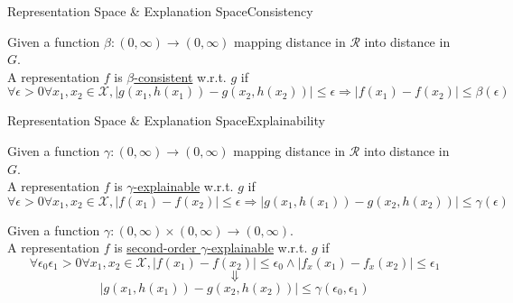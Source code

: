 \documentclass[10pt, aspectratio=169]{beamer}
\begin{document}
	\begin{frame}[t]{Representation Space \& Explanation Space}{Consistency}
		\begin{definition}
			Given a function $\beta: (0, \infty)\to (0, \infty)$ mapping distance in $\mathcal{R}$ into distance in $G$.\\
			A representation $f$ is \underline{$\beta$-consistent} w.r.t. $g$ if
			$$
			\forall\epsilon>0\forall x_1, x_2 \in \mathcal{X}, \left|g(x_1, h(x_1)) - g(x_2,h(x_2))\right|\leqslant\epsilon \Rightarrow \left|f(x_1) - f(x_2)\right|\leqslant \beta(\epsilon)
			$$
		\end{definition}
	\end{frame}
	\begin{frame}[t]{Representation Space \& Explanation Space}{Explainability}
		\begin{definition}
			Given a function $\gamma: (0, \infty)\to (0, \infty)$ mapping distance in $\mathcal{R}$ into distance in $G$.\\
			A representation $f$ is \underline{$\gamma$-explainable} w.r.t. $g$ if
			$$
			\forall\epsilon>0\forall x_1, x_2 \in \mathcal{X}, \left|f(x_1) - f(x_2)\right|\leqslant\epsilon \Rightarrow  \left|g(x_1, h(x_1)) - g(x_2,h(x_2))\right|\leqslant\gamma(\epsilon)
			$$
		\end{definition}
		
		\pause\begin{definition}
			Given a function $\gamma: (0, \infty)\times(0, \infty)\to (0, \infty)$.\\
			A representation $f$ is \underline{second-order $\gamma$-explainable} w.r.t. $g$ if
			$$
			\forall\epsilon_0\epsilon_1>0\forall x_1, x_2 \in \mathcal{X},
			\left|f(x_1) - f(x_2)\right|\leqslant\epsilon_0
			\wedge
			\left|f_x(x_1) - f_x(x_2)\right|\leqslant\epsilon_1$$
			$$
			\Downarrow
			$$
			$$
			\left|g(x_1, h(x_1)) - g(x_2,h(x_2))\right|\leqslant\gamma(\epsilon_0,\epsilon_1)
			$$
		\end{definition}
	\end{frame}
\end{document}
